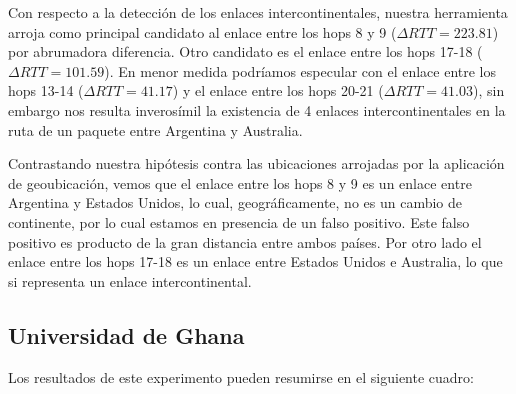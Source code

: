 Con respecto a la detección de los enlaces intercontinentales, nuestra herramienta arroja como principal candidato al enlace entre los hops 8 y 9 ($\Delta RTT = 223.81$) por abrumadora diferencia. Otro candidato es el enlace entre los hops 17-18 ($\Delta RTT = 101.59$). En menor medida podríamos especular con el enlace entre los hops 13-14 ($\Delta RTT = 41.17$) y el enlace entre los hops 20-21 ($\Delta RTT = 41.03$), sin embargo nos resulta inverosímil la existencia de 4 enlaces intercontinentales en la ruta de un paquete entre Argentina y Australia.

Contrastando nuestra hipótesis contra las ubicaciones arrojadas por la aplicación de geoubicación, vemos que el enlace entre los hops 8 y 9 es un enlace entre Argentina y Estados Unidos, lo cual, geográficamente, no es un cambio de continente, por lo cual estamos en presencia de un falso positivo. Este falso positivo es producto de la gran distancia entre ambos países. Por otro lado el enlace entre los hops 17-18 es un enlace entre Estados Unidos e Australia, lo que si representa un enlace intercontinental.

\subsection{Universidad de Ghana}

Los resultados de este experimento pueden resumirse en el siguiente cuadro:

